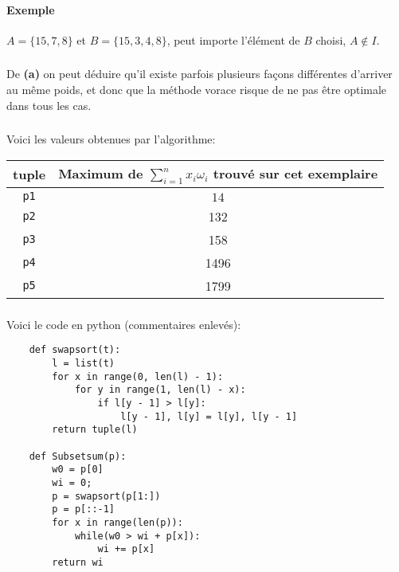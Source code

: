 \documentclass{article}
\newcommand{\key}[1]{{\bf #1}}
\begin{document}
\paragraph{Exemple} $A=\{15, 7, 8\}$ et $B=\{15, 3, 4, 8\}$, peut importe l'élément de $B$ choisi, $A \notin I$.
\subsubsection{}
De \key{(a)} on peut déduire qu'il existe parfois plusieurs façons différentes d'arriver au même poids, et donc que la méthode vorace risque de ne pas être optimale dans tous les cas.
\subsubsection{}
Voici les valeurs obtenues par l'algorithme:
\begin{center}
\begin{tabular}{|c|c|}
  tuple & Maximum de $\sum\limits_{i=1}^nx_i\omega_i$ trouvé sur cet exemplaire \\
  \hline \texttt{p1} & $\stackrel{\hspace{9cm}}{14}$\\
  \texttt{p2} & 132\\
  \texttt{p3} & 158\\
  \texttt{p4} & 1496\\
  \texttt{p5} & 1799\\\hline
\end{tabular}
\end{center}
\subsubsection{}
Voici le code en python (commentaires enlevés):
\begin{lstlisting}
    def swapsort(t):
        l = list(t)
        for x in range(0, len(l) - 1):
            for y in range(1, len(l) - x):
                if l[y - 1] > l[y]:
                    l[y - 1], l[y] = l[y], l[y - 1]
        return tuple(l)

    def Subsetsum(p):
        w0 = p[0]
        wi = 0;
        p = swapsort(p[1:])
        p = p[::-1]
        for x in range(len(p)):
            while(w0 > wi + p[x]):
                wi += p[x]
        return wi
\end{lstlisting}
\end{document}
